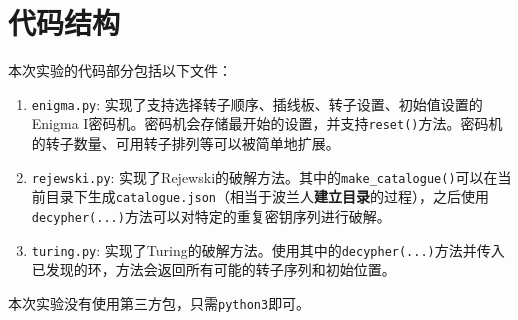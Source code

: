 \documentclass[a4paper,12pt]{article}
\begin{document}
	\section{代码结构}
	
	本次实验的代码部分包括以下文件：
	\begin{enumerate}
		\item \texttt{enigma.py}: 实现了支持选择转子顺序、插线板、转子设置、初始值设置的Enigma I密码机。密码机会存储最开始的设置，并支持\texttt{reset()}方法。密码机的转子数量、可用转子排列等可以被简单地扩展。
		
		\item \texttt{rejewski.py}: 实现了Rejewski的破解方法。其中的\texttt{make\_catalogue()}可以在当前目录下生成\texttt{catalogue.json}（相当于波兰人\textbf{建立目录}的过程），之后使用\texttt{decypher(...)}方法可以对特定的重复密钥序列进行破解。
		
		\item \texttt{turing.py}: 实现了Turing的破解方法。使用其中的\texttt{decypher(...)}方法并传入已发现的环，方法会返回所有可能的转子序列和初始位置。
	\end{enumerate}
	
	本次实验没有使用第三方包，只需\texttt{python3}即可。
	
\end{document}
